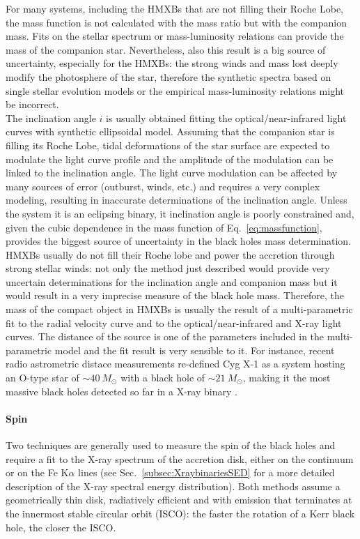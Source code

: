 \documentclass[a4paper,titlepage]{book}     	%
\newcommand{\sun}{\ensuremath{_\odot}}
\newcommand{\msun}{\ensuremath{M\sun}}
\begin{document}
For many systems, including the HMXBs that are not filling their Roche Lobe, the mass function is not calculated with the mass ratio but with the companion mass. Fits on the stellar spectrum or mass-luminosity relations can provide the mass of the companion star. Nevertheless, also this result is a big source of uncertainty, especially for the HMXBs: the strong winds and mass lost deeply modify the photosphere of the star, therefore the synthetic spectra based on single stellar evolution models or the empirical mass-luminosity relations might be incorrect.\\


The inclination angle $i$ is usually obtained fitting the optical/near-infrared light curves with synthetic ellipsoidal model. Assuming that the companion star is filling its Roche Lobe, tidal deformations of the star surface are expected to modulate the light curve profile and the amplitude of the modulation can be linked to the inclination angle. The light curve modulation can be affected by many sources of error (outburst, winds, etc.) and requires a very complex modeling, resulting in inaccurate determinations of the inclination angle.  Unless the system it is an eclipsing binary, it inclination angle is poorly constrained and, given the cubic dependence in the mass function of Eq.\ \ref{eq:massfunction}, provides the biggest source of uncertainty in the black holes mass determination. \cite{Xbinaries_massmeasure}\\


HMXBs usually do not fill their Roche lobe and power the accretion through strong stellar winds: not only the method just described would provide very uncertain determinations for the inclination angle and companion mass but it would result in a very imprecise measure of the black hole mass. Therefore, the mass of the compact object in HMXBs is usually the result of a multi-parametric fit to the radial velocity curve and to the optical/near-infrared and X-ray light curves. The distance of the source is one of the parameters included in the multi-parametric model and the fit result is very sensible to it. For instance, recent radio astrometric distace measurements re-defined Cyg X-1 as a system hosting an O-type star of $\sim 40~\msun$ with a black hole of $\sim 21~\msun$, making it the most massive black holes detected so far in a X-ray binary \cite{cygnusx1}.




\paragraph{Spin}
Two techniques are generally used to measure the spin of the black holes and require a fit to the X-ray spectrum of the accretion disk, either on the continuum or on the Fe K$\alpha$ lines (see Sec.\ \ref{subsec:XraybinariesSED} for a more detailed description of the X-ray spectral energy distribution). Both methods assume a geometrically thin disk, radiatively efficient and with emission that terminates at the innermost stable circular orbit (ISCO): the faster the rotation of a Kerr black hole, the closer the ISCO. \cite{Xbinaries_spinBHmeasure}\\
\end{document}
